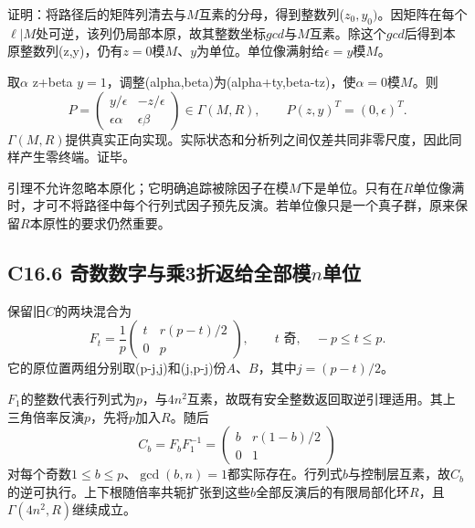 \documentclass[11pt,a4paper]{article}
\theoremstyle{definition}
\numberwithin{equation}{section}
\begin{document}
{证明：将路径后的矩阵列清去与\ensuremath{M}互素的分母，得到整数列(\ensuremath{z_{0},y_{0})}。因矩阵在每个\ensuremath{\ell |M}处可逆，该列仍局部本原，故其整数坐标\ensuremath{gcd}与\ensuremath{M}互素。除这个\ensuremath{gcd}后得到本原整数列(z,y)，仍有\ensuremath{z=0}模\ensuremath{M}、\ensuremath{y}为单位。单位像满射给\ensuremath{\epsilon =y}模\ensuremath{M}。}

{取\ensuremath{\alpha }} {z+beta} {\ensuremath{y=1}，调整(alpha,beta)为(alpha+ty,beta-tz)，使\ensuremath{\alpha =0}模\ensuremath{M}。则} \[
P=\begin{pmatrix}
y/\epsilon&-z/\epsilon\\
\epsilon\alpha&\epsilon\beta
\end{pmatrix}
\in\Gamma(M,R),\qquad
P(z,y)^T=(0,\epsilon)^T.
\tag{C16.5.1}
\] {\ensuremath{\Gamma (M,R)}提供真实正向实现。实际状态和分析列之间仅差共同非零尺度，因此同样产生零终端。证毕。}

{引理不允许忽略本原化；它明确追踪被除因子在模\ensuremath{M}下是单位。只有在\ensuremath{R}单位像满时，才可不将路径中每个行列式因子预先反演。若单位像只是一个真子群，原来保留\ensuremath{R}本原性的要求仍然重要。}

\subsection*{\texorpdfstring{{C16.6} {奇数数字与乘3折返给全部模\ensuremath{n}单位}}{C16.6 奇数数字与乘3折返给全部模单位}}\label{C16-h118}

{保留旧\ensuremath{C}的两块混合为} \[
F_t=\frac1p
\begin{pmatrix}
t&r(p-t)/2\\0&p
\end{pmatrix},
\qquad t\text{ 奇},\quad -p\le t\le p.
\tag{C16.6.1}
\] {它的原位置两组分别取(p-j,j)和(j,p-j)份\ensuremath{A}、\ensuremath{B}，其中\ensuremath{j=(p-t)/2}。}

{\ensuremath{F_{1}}的整数代表行列式为\ensuremath{p}，与\ensuremath{4n^{2}}互素，故既有安全整数返回取逆引理适用。其上三角倍率反演\ensuremath{p}，先将\ensuremath{p}加入\ensuremath{R}。随后} \[
C_b=F_bF_1^{-1}
=\begin{pmatrix}b&r(1-b)/2\\0&1\end{pmatrix}
\] {对每个奇数\ensuremath{1\le b\le p}、\ensuremath{\operatorname{gcd}(b,n)=1}都实际存在。行列式\ensuremath{b}与控制层互素，故\ensuremath{C_{b}}的逆可执行。上下根随倍率共轭扩张到这些\ensuremath{b}全部反演后的有限局部化环\ensuremath{R}，且\ensuremath{\Gamma (4n^{2},R)}继续成立。}
\end{document}
